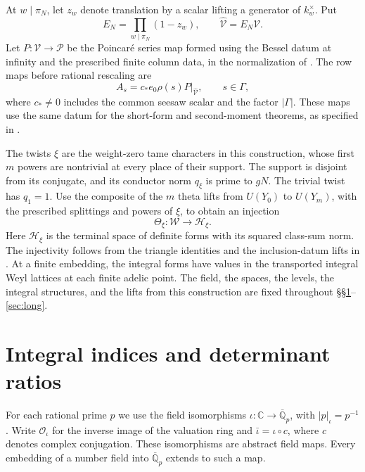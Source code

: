 \documentclass[11pt,reqno]{amsart}
\theoremstyle{definition}
\numberwithin{equation}{section}
\newcommand{\CC}{\mathbb C}
\newcommand{\QQ}{\mathbb Q}
\newcommand{\abs}[1]{\left|#1\right|}
\newcommand{\of}{\mathcal O}
\begin{document}
At \(w\mid\pi_N\), let \(z_w\) denote translation by a scalar
lifting a generator of \(k_w^\times\). Put
\begin{equation}\label{eq:ramified}
 E_N=\prod_{w\mid\pi_N}(1-z_w),\qquad
 \widehat{\mathcal V}=E_N\mathcal V.
\end{equation}
Let \(P:\mathcal V\to\mathcal P\) be the Poincar\'e series map
formed using the Bessel datum at infinity and the prescribed
finite column data, in the normalization of
\cite[\S11]{chojecki}. The row maps before rational rescaling
are
\begin{equation}\label{eq:row-maps}
 A_s=c_*e_0\rho(s)P\big|_{\widehat{\mathcal V}},
 \qquad s\in\Gamma,
\end{equation}
where \(c_*\ne0\) includes the common seesaw scalar and the
factor \(|\Gamma|\). These maps use the same datum for the
short-form and second-moment theorems, as specified in
\cite[Theorem~20.16]{chojecki}.

The twists \(\xi\) are the weight-zero tame characters in this
construction, whose first \(m\) powers are nontrivial at every
place of their support. The support is disjoint from its conjugate,
and its conductor norm \(q_\xi\) is prime to \(gN\).
The trivial twist has \(q_1=1\). Use the composite of the \(m\)
theta lifts from \(U(Y_0)\) to \(U(Y_m)\), with the prescribed
splittings and powers of \(\xi\), to obtain an injection
\[
 \Theta_\xi:\mathcal W\longrightarrow\mathcal H_\xi .
\]
Here \(\mathcal H_\xi\) is the terminal space of definite forms
with its squared class-sum norm. The injectivity follows from
the triangle identities and the inclusion-datum lifts in
\cite[\S13.8]{chojecki}.
At a finite embedding, the integral forms have values in the
transported integral Weyl lattices at each finite adelic point.
The field, the spaces, the levels, the integral structures, and
the lifts from this construction are fixed throughout
\S\S\ref{sec:gram}--\ref{sec:long}.




\section{Integral indices and determinant ratios}\label{sec:gram}

For each rational prime \(p\) we use the field isomorphisms
\(\iota:\CC\to\overline{\QQ}_p\), with
\(\abs{p}_\iota=p^{-1}\). Write \(\of_\iota\) for the inverse
image of the valuation ring and \(\bar\iota=\iota\circ c\), where
\(c\) denotes complex conjugation. These isomorphisms are
abstract field maps. Every embedding of a number field into
\(\overline{\QQ}_p\) extends to such a map.
\end{document}
